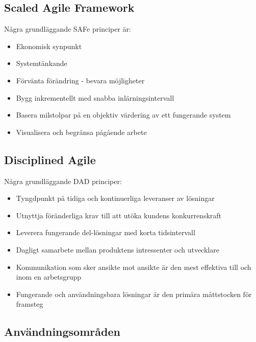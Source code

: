 	\subsection{Scaled Agile Framework}
		
		
	
		Några grundläggande SAFe principer är: \cite{safe_principles}
		\begin{itemize}
			\item Ekonomisk synpunkt
			\item Systemtänkande
			\item Förvänta förändring - bevara möjligheter
			\item Bygg inkrementellt med snabba inlärningsintervall
			\item Basera milstolpar på en objektiv värdering av ett fungerande system
			\item Visualisera och begränsa pågående arbete
		\end{itemize}
			
		
	\subsection{Disciplined Agile}
		
		
		Några grundläggande DAD principer: \cite{dad_principles}
		\begin{itemize}
			\item Tyngdpunkt på tidiga och kontinuerliga leveranser av lösningar
			\item Utnyttja föränderliga krav till att utöka kundens konkurrenskraft
			\item Leverera fungerande del-lösningar med korta tidsintervall
			\item Dagligt samarbete mellan produktens intressenter och utvecklare
			\item Kommunikation som sker ansikte mot ansikte är den mest effektiva till och inom en arbetsgrupp
			\item Fungerande och användningsbara lösningar är den primära måttstocken för framsteg
		\end{itemize}
			
	
	\subsection{Användningsområden}


